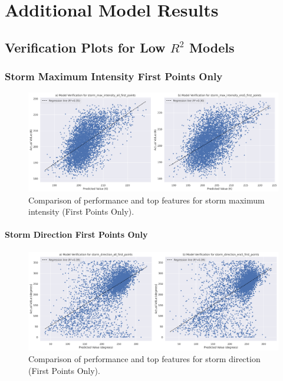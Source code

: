 \chapter{Additional Model Results}
\label{appn:modelresults}

\section{Verification Plots for Low $R^2$ Models}

\subsection{Storm Maximum Intensity First Points Only}

\begin{figure}[h]
    \centering
    \includegraphics[width=\textwidth]{../figures/generated/experiments/storm_max_intensity_first_points/storm_max_intensity_first_points_summary.png}
    \caption{Comparison of performance and top features for storm maximum intensity (First Points Only).}
    \label{fig:storm_max_intensity_first_points_summary}
\end{figure}

\subsubsection{Storm Direction First Points Only}

\begin{figure}[h]
    \centering
    \includegraphics[width=\textwidth]{../figures/generated/experiments/storm_direction_first_points/storm_direction_first_points_summary.png}
    \caption{Comparison of performance and top features for storm direction (First Points Only).}
    \label{fig:storm_direction_first_points_summary}
\end{figure}

